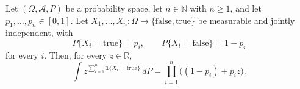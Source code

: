 \begin{theorem}
Let $(\Omega,\mathcal A,P)$ be a probability space, let
$n\in\mathbb N$ with $n\ge1$, and let $p_1,\ldots,p_n\in[0,1]$.
Let $X_1,\ldots,X_n:\Omega\to\{\mathrm{false},\mathrm{true}\}$ be
measurable and jointly independent, with
\[
 P\{X_i=\mathrm{true}\}=p_i,
 \qquad
 P\{X_i=\mathrm{false}\}=1-p_i
\]
for every $i$.  Then, for every $z\in\mathbb R$,
\[
 \int z^{\sum_{i=1}^n\mathbf 1\{X_i=\mathrm{true}\}}\,dP
 =
 \prod_{i=1}^n\bigl((1-p_i)+p_i z\bigr).
\]
\end{theorem}
